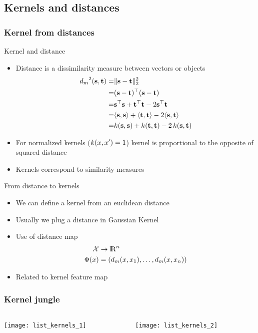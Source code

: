 \documentclass[11pt, pdf, compress, handout]{beamer}
\begin{document}
  \subsection{Kernels and distances}
\begin{frame}[allowframebreaks]
  \frametitle{Kernel from distances}
    \begin{block}{Kernel and distance}
  \begin{itemize}
  \item Distance is a dissimilarity measure between vectors or objects
    \begin{align*}
      {d_m}^2({\mathbf{s}},{\mathbf{t}}) = &\| {\mathbf{s}} - {\mathbf{t}} \|_2^2 \\
      = & ({\mathbf{s}} - {\mathbf{t}})^\top ({\mathbf{s}} - {\mathbf{t}}) \\
      = & {\mathbf{s}}^\top{\mathbf{s}} + {\mathbf{t}}^\top{\mathbf{t}} -2 {\mathbf{s}}^\top {\mathbf{t}} \\
      = & \langle {\mathbf{s}}, {\mathbf{s}} \rangle + \langle {\mathbf{t}}, {\mathbf{t}} \rangle - 2  \langle
          {\mathbf{s}}, {\mathbf{t}} \rangle \\   
      = & {\mathnormal{k}}({\mathbf{s}}, {\mathbf{s}}) + {\mathnormal{k}}( {\mathbf{t}}, {\mathbf{t}}) - 2 \, {\mathnormal{k}}({\mathbf{s}}, {\mathbf{t}}) \\                    
    \end{align*}
  \item For normalized kernels (${\mathnormal{k}}({\mathnormal{x}},{\mathnormal{x}}') = 1$) kernel is
    proportional to the opposite of squared distance
  \item Kernels correspond to similarity measures
  \end{itemize}
\end{block}
\framebreak
\begin{block}{From distance to kernels}
  \begin{itemize}
  \item We can define a kernel from an euclidean distance
  \item Usually we plug a distance in Gaussian Kernel
  \item Use of distance map
    \begin{align*}
      {\mathcal{X}} &\to  {\mathrm{I\hskip-2.2pt R}}^n \\
    \Phi({\mathnormal{x}}) &=  ( {d_m}({\mathnormal{x}},{\mathnormal{x}}_1), \dots, {d_m}({\mathnormal{x}},{\mathnormal{x}}_n))  
    \end{align*}
    
  \item Related to kernel feature map 
  \end{itemize}
\end{block}
\end{frame} 

\begin{frame}
  \frametitle{Kernel jungle}
  \begin{columns}
    \begin{column}{0.5\textwidth}
  \texttt{[image: list\_kernels\_1]}
      
    \end{column}
    \begin{column}{0.5\textwidth}
  \texttt{[image: list\_kernels\_2]}
  
    \end{column}
  \end{columns}

 \citep{Shawe-kernel-2004}
\end{frame}  
\end{document}
